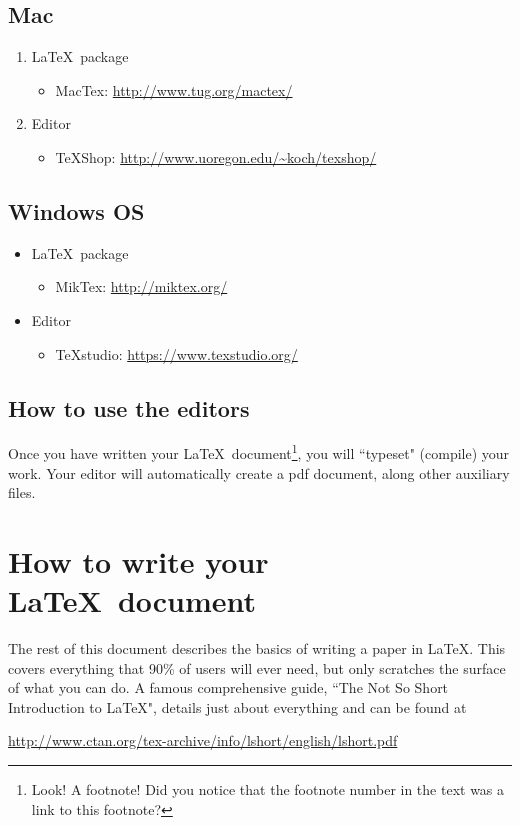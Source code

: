 \documentclass[12pt]{article}
\begin{document}
\subsection{Mac}

\begin{enumerate}
\item \LaTeX\ package
\begin{itemize}
\item MacTex: \url{http://www.tug.org/mactex/}
\end{itemize}
\item Editor
\begin{itemize}
\item TeXShop: \url{http://www.uoregon.edu/~koch/texshop/}
\end{itemize}
\end{enumerate}

\subsection{Windows OS} \label{sec:win}
\begin{itemize}
\item \LaTeX\ package
\begin{itemize}
\item MikTex: \url{http://miktex.org/}
\end{itemize}
\item Editor
\begin{itemize}
\item TeXstudio: \url{https://www.texstudio.org/}
\end{itemize}
\end{itemize}


\subsection{How to use the editors}
Once you have written your \LaTeX\ document\footnote{Look! A footnote! Did you notice that the footnote number in the text was a link to this footnote?}, you will ``typeset" (compile) your work. Your editor will automatically create a pdf document, along other auxiliary files. 

\section{How to write your \LaTeX\ document}
The rest of this document describes the basics of writing a paper in \LaTeX. This covers everything that 90\% of users will ever need, but only scratches the surface of what you can do. A famous comprehensive guide, ``The Not So Short Introduction to \LaTeX", details just about everything and can be found at
\begin{center}\url{http://www.ctan.org/tex-archive/info/lshort/english/lshort.pdf}\end{center}
\end{document}

